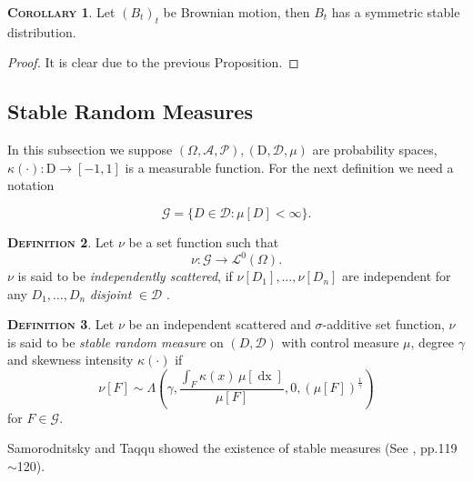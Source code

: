 \documentclass[a4paper, twoside, 11pt]{article}
\theoremstyle{definition}
\newtheorem{definition}{\scshape Definition}[section]
\newtheorem{corollary}[definition]{\scshape Corollary}
\newcommand{\brkt}[1]{\left({#1} \right)}
\begin{document}
  \begin{corollary}
	Let $(B_t)_t$ be Brownian motion, then $B_t$ has a symmetric stable \\distribution.
  \end{corollary}
  \begin{proof}
	It is clear due to the previous Proposition.
  \end{proof}

  \subsection{Stable Random Measures}
  In this subsection we suppose $(\Omega, \mathscr{A}, \mathcal{P}), (\mathrm{D}, \mathscr{D}, \mu)$  are probability spaces, $\kappa(\cdot) : \mathrm{D} \rightarrow [-1, 1]$ is a measurable function. For the next definition we need a notation

  \begin{equation}
	\mathscr{G} = \{D \in \mathscr{D} : \mu[D] < \infty\}.
  \end{equation}

  \begin{definition}
	  Let $\nu$ be a set function such that
	  \begin{equation}
		\nu : \mathscr{G} \rightarrow \mathcal{L}^0(\Omega).\nonumber
	  \end{equation}
	  $\nu$ is said to be \emph{independently scattered}, if $\nu[D_1], \dots, \nu[D_n]$ are independent for any $D_1,\dots, D_n$ \emph{disjoint} $\in \mathscr{D}$ .
  \end{definition}


  \begin{definition}
	Let $\nu$ be an independent scattered and $\sigma$-additive set function,
  $\nu$ is said to be \emph{stable random measure} on $(D, \mathscr{D})$ with control measure $\mu$, degree $\gamma$ and skewness intensity $\kappa(\cdot)$ if 
  \begin{equation}
	\nu[F] \sim \Lambda\brkt{\gamma, \frac{\int_F \kappa(x)\, \mu[\mathop{dx}]}{\mu[F]}, 0, (\mu[F])^{\frac{1}{\gamma}}}
  \end{equation}
  for $F \in \mathscr{G}$.
  \end{definition}
  Samorodnitsky and Taqqu showed the existence of stable measures (See \cite{samorodnitsky}, pp.119$\sim$120).
\end{document}
